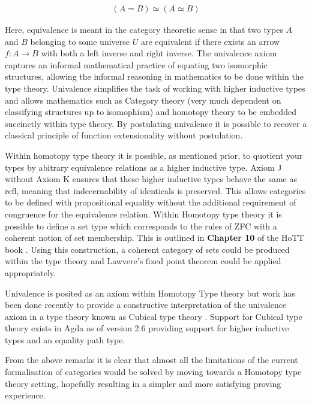 \begin{align*}
    (A = B) \simeq (A \simeq B)
\end{align*}

Here, equivalence is meant in the category theoretic sense in that
two types $A$ and $B$ belonging to some universe $U$ are equivalent if there
exists an arrow $f : A \rightarrow B$ with both a left inverse and right
inverse. The univalence axiom captures an informal mathematical practice of
equating two isomorphic structures, allowing the informal reasoning in
mathematics to be done within the type theory. Univalence simplifies the task of
working with higher inductive types and allows mathematics such as Category
theory (very much dependent on classifying structures up to isomophism) and
homotopy theory to be embedded succinctly within type theory. By postulating
univalence it is possible to recover a classical principle of function
extensionality without postulation.

Within homotopy type theory it is possible, as mentioned prior, to quotient your
types by abitrary equivalence relations as a higher inductive type.
\textsf{Axiom J} without \textsf{Axiom K} ensures that these higher inductive
types behave the same as \textsf{refl}, meaning that indecernability of identicals
is preserved. This allows categories to be defined with propositional equality
without the additional requirement of congruence for the equivalence relation.
Within Homotopy type theory it is possible to define a set type which
corresponds to the rules of ZFC with a coherent notion of set membership. This
is outlined in \textbf{Chapter 10} of the HoTT book \cite{hottbook} . Using this construction, a coherent category of sets
could be produced within the type theory and Lawvere's fixed point theorem could
be applied appropriately.

Univalence is posited as an axiom within Homotopy Type theory but work has been
done recently to provide a constructive interpretation of the univalence axiom
in a type theory known as Cubical type theory \cite{cohen2016cubical}.  Support for Cubical type theory exists in Agda as of version
2.6 providing support for higher inductive types and an equality path type.

From the above remarks it is clear that almost all the limitations of the
current formalisation of categories would be solved by moving towards a Homotopy
type theory setting, hopefully resulting in a simpler and more satisfying
proving experience.
